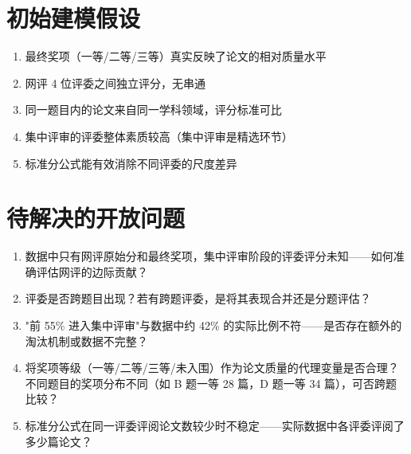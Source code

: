 \documentclass[UTF8]{ctexart}
\begin{document}
\section{初始建模假设}

\begin{enumerate}
    \item 最终奖项（一等/二等/三等）真实反映了论文的相对质量水平
    \item 网评 4 位评委之间独立评分，无串通
    \item 同一题目内的论文来自同一学科领域，评分标准可比
    \item 集中评审的评委整体素质较高（集中评审是精选环节）
    \item 标准分公式能有效消除不同评委的尺度差异
\end{enumerate}

\section{待解决的开放问题}

\begin{enumerate}
    \item 数据中只有网评原始分和最终奖项，集中评审阶段的评委评分未知——如何准确评估网评的边际贡献？
    \item 评委是否跨题目出现？若有跨题评委，是将其表现合并还是分题评估？
    \item "前 55\% 进入集中评审"与数据中约 42\% 的实际比例不符——是否存在额外的淘汰机制或数据不完整？
    \item 将奖项等级（一等/二等/三等/未入围）作为论文质量的代理变量是否合理？不同题目的奖项分布不同（如 B 题一等 28 篇，D 题一等 34 篇），可否跨题比较？
    \item 标准分公式在同一评委评阅论文数较少时不稳定——实际数据中各评委评阅了多少篇论文？
\end{enumerate}
\end{document}
